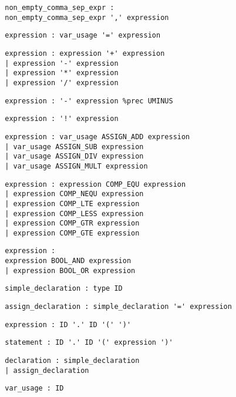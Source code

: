 \documentclass[10pt,landscape]{article}
\begin{document}
\begin{multicols}{3}
		\begin{verbatim}
		non_empty_comma_sep_expr :
		non_empty_comma_sep_expr ',' expression
		\end{verbatim}
		\begin{verbatim}
		expression : var_usage '=' expression
		\end{verbatim}
		\begin{verbatim}
		expression : expression '+' expression
		| expression '-' expression
		| expression '*' expression
		| expression '/' expression
		\end{verbatim}
		\begin{verbatim}
		expression : '-' expression %prec UMINUS
		\end{verbatim}
		\begin{verbatim}
		expression : '!' expression
		\end{verbatim}
		\begin{verbatim}
		expression : var_usage ASSIGN_ADD expression
		| var_usage ASSIGN_SUB expression
		| var_usage ASSIGN_DIV expression
		| var_usage ASSIGN_MULT expression
		\end{verbatim}
		\begin{verbatim}
		expression : expression COMP_EQU expression
		| expression COMP_NEQU expression
		| expression COMP_LTE expression
		| expression COMP_LESS expression
		| expression COMP_GTR expression
		| expression COMP_GTE expression
		\end{verbatim}
		\begin{verbatim}
		expression : 
		expression BOOL_AND expression
		| expression BOOL_OR expression
		\end{verbatim}
		\begin{verbatim}
		simple_declaration : type ID
		\end{verbatim}
		\begin{verbatim}
		assign_declaration : simple_declaration '=' expression
		\end{verbatim}
		\begin{verbatim}
		expression : ID '.' ID '(' ')'
		\end{verbatim}
		\begin{verbatim}
		statement : ID '.' ID '(' expression ')'
		\end{verbatim}
		\begin{verbatim}
		declaration : simple_declaration
		| assign_declaration
		\end{verbatim}
		\begin{verbatim}
		var_usage : ID
		\end{verbatim}

\end{multicols}
\end{document}
